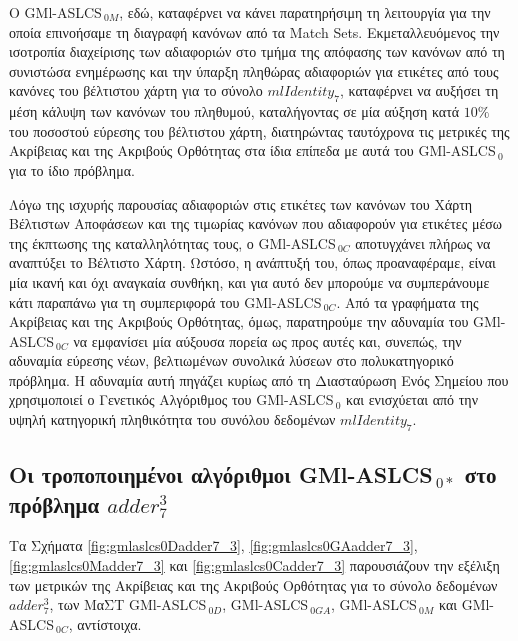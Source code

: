 Ο GMl-ASLCS$_{\:0M}$, εδώ, καταφέρνει να κάνει παρατηρήσιμη τη λειτουργία για την οποία επινοήσαμε τη διαγραφή κανόνων από τα Match Sets. Εκμεταλλευόμενος την ισοτροπία διαχείρισης των αδιαφοριών στο τμήμα της απόφασης των κανόνων από τη συνιστώσα ενημέρωσης και την ύπαρξη πληθώρας αδιαφοριών για ετικέτες από τους κανόνες του βέλτιστου χάρτη για το σύνολο $mlIdentity_{7}$, καταφέρνει να αυξήσει τη μέση κάλυψη των κανόνων του πληθυμού, καταλήγοντας σε μία αύξηση κατά $10\%$ του ποσοστού εύρεσης του βέλτιστου χάρτη, διατηρώντας ταυτόχρονα τις μετρικές της Ακρίβειας και της Ακριβούς Ορθότητας στα ίδια επίπεδα με αυτά του GMl-ASLCS$_{\:0}$ για το ίδιο πρόβλημα.

Λόγω της ισχυρής παρουσίας αδιαφοριών στις ετικέτες των κανόνων του Χάρτη Βέλτιστων Αποφάσεων και της τιμωρίας κανόνων που αδιαφορούν για ετικέτες μέσω της έκπτωσης της καταλληλότητας τους, ο GMl-ASLCS$_{\:0C}$ αποτυγχάνει πλήρως να αναπτύξει το Βέλτιστο Χάρτη. Ωστόσο, η ανάπτυξή του, όπως προαναφέραμε, είναι μία ικανή και όχι αναγκαία συνθήκη, και για αυτό δεν μπορούμε να συμπεράνουμε κάτι παραπάνω για τη συμπεριφορά του GMl-ASLCS$_{\:0C}$. Από τα γραφήματα της Ακρίβειας και της Ακριβούς Ορθότητας, όμως, παρατηρούμε την αδυναμία του GMl-ASLCS$_{\:0C}$ να εμφανίσει μία αύξουσα πορεία ως προς αυτές και, συνεπώς, την αδυναμία εύρεσης νέων, βελτιωμένων συνολικά λύσεων στο πολυκατηγορικό πρόβλημα. Η αδυναμία αυτή πηγάζει κυρίως από τη Διασταύρωση Ενός Σημείου που χρησιμοποιεί ο Γενετικός Αλγόριθμος του GMl-ASLCS$_{\:0}$ και ενισχύεται από την υψηλή κατηγορική πληθικότητα του συνόλου δεδομένων $mlIdentity_{7}$. 





\subsection{Οι τροποποιημένοι αλγόριθμοι GMl-ASLCS$_{\:0*}$ στο πρόβλημα $adder_{7}^{3}$}
Τα Σχήματα \ref{fig:gmlaslcs0Dadder7_3}, \ref{fig:gmlaslcs0GAadder7_3}, \ref{fig:gmlaslcs0Madder7_3} και \ref{fig:gmlaslcs0Cadder7_3} παρουσιάζουν την εξέλιξη των μετρικών της Ακρίβειας και της Ακριβούς Ορθότητας για το σύνολο δεδομένων  $adder_{7}^{3}$, των ΜαΣΤ GMl-ASLCS$_{\:0D}$, GMl-ASLCS$_{\:0GA}$, GMl-ASLCS$_{\:0M}$ και GMl-ASLCS$_{\:0C}$, αντίστοιχα.


